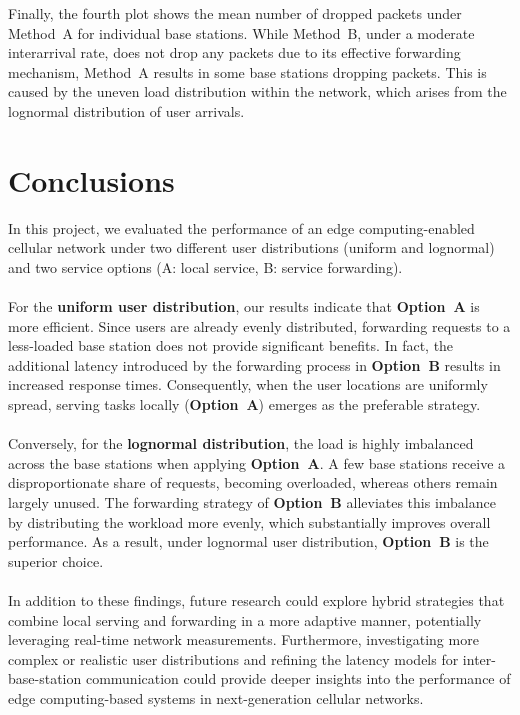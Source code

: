 \documentclass{report}
\begin{document}
\begin{flushleft}
Finally, the fourth plot shows the mean number of dropped packets under Method~A for individual base stations. While Method~B, under a moderate interarrival rate, does not drop any packets due to its effective forwarding mechanism, Method~A results in some base stations dropping packets. This is caused by the uneven load distribution within the network, which arises from the lognormal distribution of user arrivals.
\end{flushleft}

\chapter{Conclusions}
In this project, we evaluated the performance of an edge computing-enabled cellular network under two different user distributions (uniform and lognormal) and two service options (A: local service, B: service forwarding).\\\\
For the \textbf{uniform user distribution}, our results indicate that \textbf{Option~A} is more efficient. Since users are already evenly distributed, forwarding requests to a less-loaded base station does not provide significant benefits. In fact, the additional latency introduced by the forwarding process in \textbf{Option~B} results in increased response times. Consequently, when the user locations are uniformly spread, serving tasks locally (\textbf{Option~A}) emerges as the preferable strategy.\\\\
Conversely, for the \textbf{lognormal distribution}, the load is highly imbalanced across the base stations when applying \textbf{Option~A}. A few base stations receive a disproportionate share of requests, becoming overloaded, whereas others remain largely unused. The forwarding strategy of \textbf{Option~B} alleviates this imbalance by distributing the workload more evenly, which substantially improves overall performance. As a result, under lognormal user distribution, \textbf{Option~B} is the superior choice.\\\\
In addition to these findings, future research could explore hybrid strategies that combine local serving and forwarding in a more adaptive manner, potentially leveraging real-time network measurements. Furthermore, investigating more complex or realistic user distributions and refining the latency models for inter-base-station communication could provide deeper insights into the performance of edge computing-based systems in next-generation cellular networks.

\appendix
\end{document}
